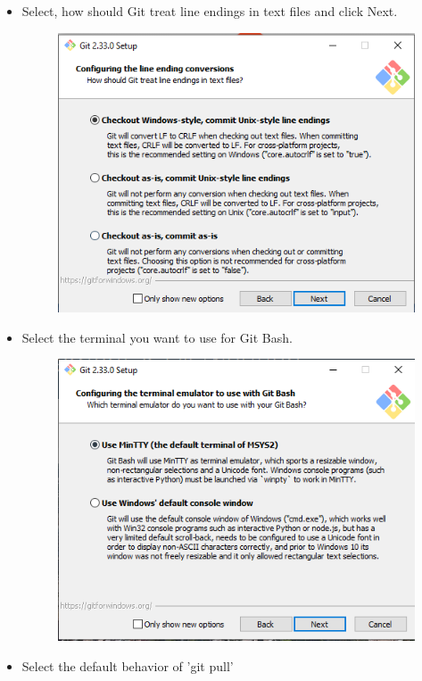 \documentclass[10pt]{article} %
\begin{document}
\begin{itemize}
        \item Select, how should Git treat line endings in text files and click Next.

        \begin{figure}[h!]
          \centering
          \includegraphics[width=0.7\linewidth]{figs/GitBash7}
          \caption{}
          \label{fig:gitbash7}
        \end{figure}

		\pagebreak

        \item Select the terminal you want to use for Git Bash.

        \begin{figure}[h!]
          \centering
          \includegraphics[width=0.7\linewidth]{figs/GitBash8}
          \caption{}
          \label{fig:gitbash8}
        \end{figure}

        \item Select the default behavior of 'git pull'


\end{itemize}
\end{document}
